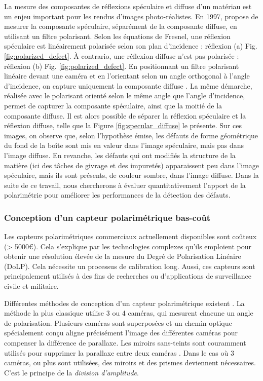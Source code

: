 La mesure des composantes de réflexions spéculaire et diffuse d'un matériau est un enjeu important pour les rendus d'images photo-réalistes.
En 1997, \citeauthor{nayar_separation_1997} \cite{nayar_separation_1997} propose de mesurer la composante spéculaire, séparément de la composante diffuse, en utilisant un filtre polarisant.
Selon les équations de Fresnel, une réflexion spéculaire est linéairement polarisée selon son plan d'incidence : réflexion (a) Fig. \ref{fig:polarized_defect}.
À contrario, une réflexion diffuse n'est pas polarisée : réflexion (b) Fig. \ref{fig:polarized_defect}.
En positionnant un filtre polarisant linéaire devant une caméra et en l'orientant selon un angle orthogonal à l'angle d'incidence, on capture uniquement la composante diffuse \cite{debevec_acquiring_2000}.
La même démarche, réalisée avec le polarisant orienté selon le même angle que l'angle d'incidence, permet de capturer la composante spéculaire, ainsi que la moitié de la composante diffuse.
Il est alors possible de séparer la réflexion spéculaire et la réflexion diffuse, telle que la Figure \ref{fig:specular_diffuse} le présente.
Sur ces images, on observe que, selon l'hypothèse émise, les défauts de forme géométrique du fond de la boîte sont mis en valeur dans l'image spéculaire, mais pas dans l'image diffuse.
En revanche, les défauts qui ont modifiés la structure de la matière (ici des tâches de givrage et des impuretés) apparaissent peu dans l'image spéculaire, mais ils sont présents, de couleur sombre, dans l'image diffuse.
Dans la suite de ce travail, nous chercherons à évaluer quantitativement l'apport de la polarimétrie pour améliorer les performances de la détection des défauts.

\subsubsection{Conception d'un capteur polarimétrique bas-coût}
Les capteurs polarimétriques commerciaux actuellement disponibles sont coûteux (> 5000€).
Cela s'explique par les technologies complexes qu'ils emploient pour obtenir une résolution élevée de la mesure du Degré de Polarisation Linéaire (DoLP).
Cela nécessite un processus de calibration long.
Aussi, ces capteurs sont principalement utilisés à des fins de recherches ou d'applications de surveillance civile et militaire.

Différentes méthodes de conception d'un capteur polarimétrique existent \cite{tyo_review_2006}.
La méthode la plus classique utilise 3 ou 4 caméras, qui mesurent chacune un angle de polarisation.
Plusieurs caméras sont superposées et un chemin optique spécialement conçu aligne précisément l'image des différentes caméras pour compenser la différence de parallaxe.
Les miroirs sans-teints sont couramment utilisés pour supprimer la parallaxe entre deux caméras \cite{wolff_polarization_1995}.
Dans le cas où 3 caméras, ou plus sont utilisées, des miroirs et des prismes deviennent nécessaires.
C'est le principe de la \textit{division d'amplitude}.

